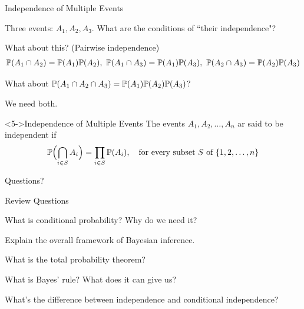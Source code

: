 \documentclass[fleqn,aspectratio=169]{beamer}
\begin{document}
\begin{frame}{Independence of Multiple Events}

\plitemsep 0.1in
\bci 

\item<1-> Three events: $A_1, A_2, A_3.$ What are the conditions of ``their independence"?

\item<2-> What about this? (Pairwise independence)
\begin{align*}
\mathbb{P}( A_1 \cap A_2 ) = \mathbb{P}( A_1 ) \mathbb{P}( A_2 ), \
\mathbb{P}( A_1 \cap A_3 ) = \mathbb{P}( A_1 ) \mathbb{P}( A_3 ), \
\mathbb{P}( A_2 \cap A_3 ) = \mathbb{P}( A_2 ) \mathbb{P}( A_3 )
\end{align*}

\item<3-> What about $\mathbb{P}( A_1 \cap A_2 \cap A_3 ) = \mathbb{P}( A_1 ) \mathbb{P}( A_2 ) \mathbb{P}( A_3 )$?

\item<4-> We need both. 

\begin{block}<5->{Independence of Multiple Events}
The events $A_1,A_2, \ldots, A_n$ ar said to be independent if
$$
\mathbb{P}\Bigl( \bigcap_{i \in S} A_i \Bigr) = \prod_{i \in S} \mathbb{P}( A_i ), \quad \text{for every subset } S \text{ of } \{1,2, \ldots, n \}
$$
\end{block}
\eci 
\end{frame}


\begin{frame}{}
\vspace{2cm}
\LARGE Questions?

\end{frame}

\begin{frame}{Review Questions}
\bce[1)]
\item What is conditional probability? Why do we need it?

\item Explain the overall framework of Bayesian inference.

\item What is the total probability theorem?

\item What is Bayes' rule? What does it can give us?

\item What's the difference between independence and conditional independence?

\ece
\end{frame}
\end{document}
